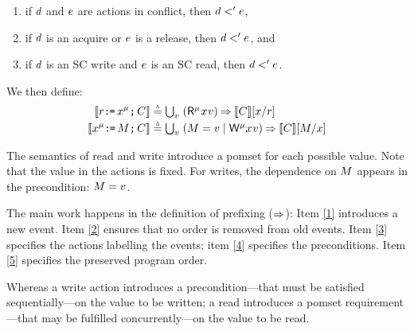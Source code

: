 \begin{candidate}
\begin{enumerate}
\item[{\labeltextsc[P5b]{(P5b)}{5b}}] if $d$ and $e$ are \external actions in conflict,
    then $d<'e$, %
\item[{\labeltextsc[P5c]{(P5c)}{5c}}] if $d$ is an acquire or $e$ is a release, then $d <' e$, and
\item[{\labeltextsc[P5d]{(P5d)}{5d}}] if $d$ is an SC write and $e$ is an SC read, then $d <' e$.
\end{enumerate}
  We then define:
  \begin{gather*}
    \begin{aligned}[t]
      \sem{\aReg\GETS\aLoc^\amode\SEMI \aCmd} & \eqdef \textstyle\bigcup_\aVal\;
      (\DRmode\aLoc\aVal) \prefix \sem{\aCmd} [\aLoc/\aReg]
      \\
      \sem{\aLoc^\amode\GETS\aExp\SEMI \aCmd} & \eqdef
      \textstyle\bigcup_\aVal\; (\aExp=\aVal \mid \DWmode\aLoc\aVal)
      \prefix \sem{\aCmd}[\aExp/\aLoc]
    \end{aligned}
  \end{gather*}
\end{candidate}

The semantics of read and write introduce a pomset for each possible value.
Note that the value in the actions is fixed.  For writes, the dependence on
$M$ appears in the precondition: $M=v$.

The main work happens in the definition of prefixing ($\mathbin\Rightarrow$): Item
\ref{1} introduces a new event.  Item \ref{2} ensures that no order is
removed from old events. Item \ref{3} specifies the actions labelling the
events; item \ref{4} specifies the preconditions.  Item \ref{5}
specifies the preserved program order.

Whereas a write action introduces a precondition---that must be satisfied
sequentially---on the value to be written; a read introduces a pomset
requirement---that may be fulfilled concurrently---on the value to be read.

